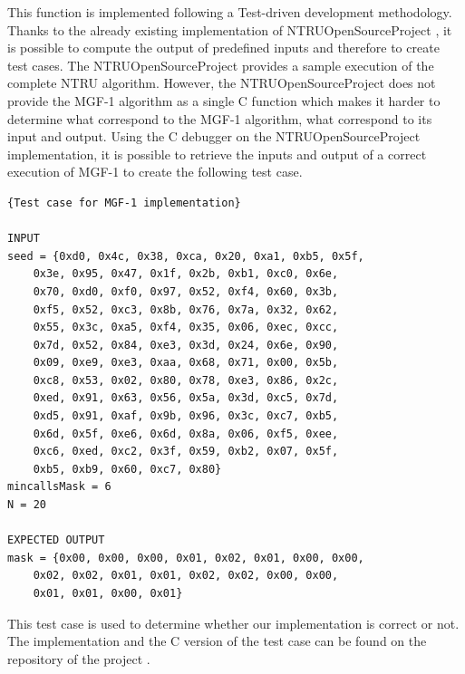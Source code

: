 This function is implemented following a Test-driven development methodology. Thanks to the already existing implementation of NTRUOpenSourceProject \cite{noauthor_open_2018}, it is possible to compute the output of predefined inputs and therefore to create test cases. The NTRUOpenSourceProject provides a sample execution of the complete NTRU algorithm. However, the NTRUOpenSourceProject does not provide the MGF-1 algorithm as a single C function which makes it harder to determine what correspond to the MGF-1 algorithm, what correspond to its input and output. Using the C debugger on the NTRUOpenSourceProject implementation, it is possible to retrieve the inputs and output of a correct execution of MGF-1 to create the following test case.

\begin{lstlisting}[style=base,frame=single,mathescape=true]
{Test case for MGF-1 implementation}

INPUT 
seed = {0xd0, 0x4c, 0x38, 0xca, 0x20, 0xa1, 0xb5, 0x5f,
	0x3e, 0x95, 0x47, 0x1f, 0x2b, 0xb1, 0xc0, 0x6e,
	0x70, 0xd0, 0xf0, 0x97, 0x52, 0xf4, 0x60, 0x3b,
	0xf5, 0x52, 0xc3, 0x8b, 0x76, 0x7a, 0x32, 0x62,
	0x55, 0x3c, 0xa5, 0xf4, 0x35, 0x06, 0xec, 0xcc,
	0x7d, 0x52, 0x84, 0xe3, 0x3d, 0x24, 0x6e, 0x90,
	0x09, 0xe9, 0xe3, 0xaa, 0x68, 0x71, 0x00, 0x5b,
	0xc8, 0x53, 0x02, 0x80, 0x78, 0xe3, 0x86, 0x2c,
	0xed, 0x91, 0x63, 0x56, 0x5a, 0x3d, 0xc5, 0x7d,
	0xd5, 0x91, 0xaf, 0x9b, 0x96, 0x3c, 0xc7, 0xb5,
	0x6d, 0x5f, 0xe6, 0x6d, 0x8a, 0x06, 0xf5, 0xee,
	0xc6, 0xed, 0xc2, 0x3f, 0x59, 0xb2, 0x07, 0x5f,
	0xb5, 0xb9, 0x60, 0xc7, 0x80}
mincallsMask = 6
N = 20

EXPECTED OUTPUT
mask = {0x00, 0x00, 0x00, 0x01, 0x02, 0x01, 0x00, 0x00, 
	0x02, 0x02, 0x01, 0x01, 0x02, 0x02, 0x00, 0x00,
	0x01, 0x01, 0x00, 0x01}
\end{lstlisting}

This test case is used to determine whether our implementation is correct or not. The implementation and the C version of the test case can be found on the repository of the project \cite{simonetto_ntru_2018}.







